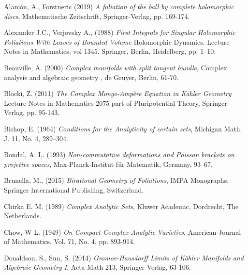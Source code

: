 \documentclass{article}
\begin{document}
%
\begin{thebibliography}{3}

 Alarc\'on, A., Forstneric (2019) \textit{A foliation of the ball by complete holomorphic discs}, Mathematische Zeitschrift,
Springer-Verlag, pp. 169-174.

 Alexander J.C., Verjovsky A., (1988) \textit{First Integrals for Singular Holomorphic Foliations With Leaves of Bounded Volume}
Holomorphic Dynamics. Lecture Notes in Mathematics, vol 1345. Springer, Berlin, Heidelberg, pp. 1–10.

 Beauville, A. (2000) \textit{Complex manifolds with split tangent bundle}, Complex analysis and algebraic geometry
, de Gruyer, Berlin, 61-70.

 Blocki, Z. (2011) \textit{The Complex Monge-Amp\`ere Equation in K\"ahler Geometry} Lecture Notes in Mathematics 2075
part of Pluripotential Theory, Springer-Verlag, pp. 95-143.

 Bishop, E. (1964) \textit{Conditions for the Analyticity  of certain sets}, Michigan Math. J. 11, No. 4, 289--304. 

 Bondal, A. I,. (1993) \textit{Non-commutative deformations and Poisson brackets on projetive spaces}, 
Max-Planck-Institut f\"ur Matematik, Germany, 93–67.

 Brunella, M., (2015) \textit{Birational Geometry of Foliations}, IMPA Monographs, 
Springer International Publishing, Switzerland.

 Chirka E. M. (1989) \textit{Complex Analytic Sets}, Kluwer
Academic, Dordrecht, The Netherlands. 

 Chow, W-L. (1949) \textit{On Compact Complex Analytic Varieties},
American Journal of Mathematics, Vol. 71, No. 4, pp. 893-914.

 Donaldson, S., Sun, S. (2014) \textit{Gromov-Hausdorff Limits of K\"ahler Manifolds and Algebraic Geometry I},
 Acta Math 213, Springer-Verlag, 63-106.


\end{thebibliography}
\end{document}
